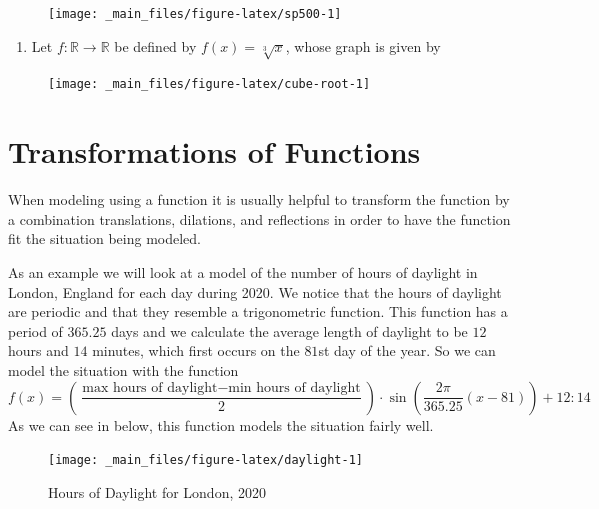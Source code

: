 \documentclass[
]{book}
\providecommand{\tightlist}{%
  \setlength{\itemsep}{0pt}\setlength{\parskip}{0pt}}
\theoremstyle{definition}
\theoremstyle{definition}
\theoremstyle{definition}
\theoremstyle{definition}
\theoremstyle{remark}
\begin{document}
\begin{enumerate}
  \begin{figure}

     {\centering \texttt{[image: \_main\_files/figure-latex/sp500-1]} 

     }

     \end{figure}

  \begin{enumerate}
  \def\labelenumii{\alph{enumii}.}
  \tightlist
  \item
    Let \(f:\mathbb{R} \rightarrow \mathbb{R}\) be defined by \(f(x)=\sqrt[3]{x}\), whose graph is given by
  \end{enumerate}

  \begin{figure}

     {\centering \texttt{[image: \_main\_files/figure-latex/cube-root-1]} 

     }

     \end{figure}
\end{enumerate}

\hypertarget{transformations-of-functions}{%
\section{Transformations of Functions}\label{transformations-of-functions}}

When modeling using a function it is usually helpful to transform the function by a combination translations, dilations, and reflections in order to have the function fit the situation being modeled.

As an example we will look at a model of the number of hours of daylight in London, England for each day during 2020. We notice that the hours of daylight are periodic and that they resemble a trigonometric function. This function has a period of \(365.25\) days and we calculate the average length of daylight to be \(12\) hours and \(14\) minutes, which first occurs on the \(81\)st day of the year. So we can model the situation with the function \[f(x)= \left( \frac{\mbox{max hours of daylight} - \mbox{min hours of daylight}}{2}\right) \cdot \sin \left(\frac{2\pi}{365.25} \left(x-81\right)\right) + 12:14\]
As we can see in below, this function models the situation fairly well.

\begin{figure}

{\centering \texttt{[image: \_main\_files/figure-latex/daylight-1]} 

}

\caption{Hours of Daylight for London, 2020}\label{fig:daylight}
\end{figure}
\end{document}
